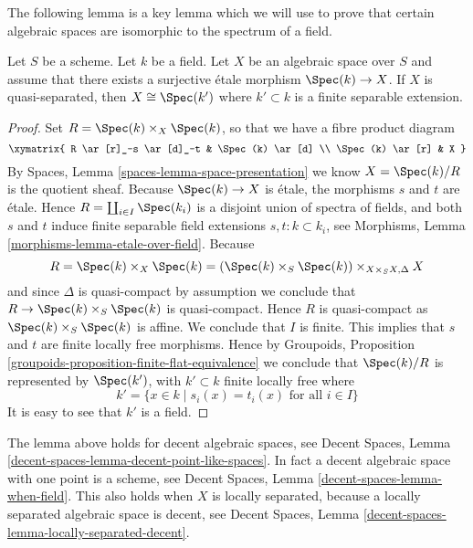 \medskip\noindent
The following lemma is a key lemma which we will use to prove that
certain algebraic spaces are isomorphic to the spectrum of a field.

\begin{lemma}
\label{lemma-point-like-spaces}
Let $S$ be a scheme. Let $k$ be a field.
Let $X$ be an algebraic space over $S$ and assume that there exists
a surjective \'etale morphism $\Spec(k) \to X$.
If $X$ is quasi-separated, then $X \cong \Spec(k')$
where $k' \subset k$ is a finite separable extension.
\end{lemma}

\begin{proof}
Set $R = \Spec(k) \times_X \Spec(k)$, so that we have a
fibre product diagram
$$
\xymatrix{
R \ar[r]_-s \ar[d]_-t & \Spec(k) \ar[d] \\
\Spec(k) \ar[r] & X
}
$$
By
Spaces, Lemma \ref{spaces-lemma-space-presentation}
we know $X = \Spec(k)/R$ is the quotient sheaf.
Because $\Spec(k) \to X$ is \'etale, the morphisms $s$ and $t$ are
\'etale. Hence $R = \coprod_{i \in I} \Spec(k_i)$ is a disjoint
union of spectra of fields, and both $s$ and $t$
induce finite separable field extensions $s, t : k \subset k_i$, see
Morphisms, Lemma \ref{morphisms-lemma-etale-over-field}.
Because
$$
R = \Spec(k) \times_X \Spec(k)
= (\Spec(k) \times_S \Spec(k)) \times_{X \times_S X, \Delta} X
$$
and since $\Delta$ is quasi-compact by assumption we conclude that
$R \to \Spec(k) \times_S \Spec(k)$ is quasi-compact.
Hence $R$ is quasi-compact as $\Spec(k) \times_S \Spec(k)$ is
affine. We conclude that $I$ is finite. This implies
that $s$ and $t$ are finite locally free morphisms. Hence by
Groupoids, Proposition \ref{groupoids-proposition-finite-flat-equivalence}
we conclude that $\Spec(k)/R$ is
represented by $\Spec(k')$, with $k' \subset k$ finite locally free
where
$$
k' = \{x \in k \mid s_i(x) = t_i(x)\text{ for all }i \in I\}
$$
It is easy to see that $k'$ is a field.
\end{proof}

\begin{remark}
\label{remark-cannot-decide-yet}
The lemma above holds for decent algebraic spaces, see
Decent Spaces, Lemma \ref{decent-spaces-lemma-decent-point-like-spaces}.
In fact a decent algebraic space with one point is a scheme, see
Decent Spaces, Lemma \ref{decent-spaces-lemma-when-field}.
This also holds when $X$ is locally separated, because a
locally separated algebraic space is decent, see
Decent Spaces, Lemma \ref{decent-spaces-lemma-locally-separated-decent}.
\end{remark}

